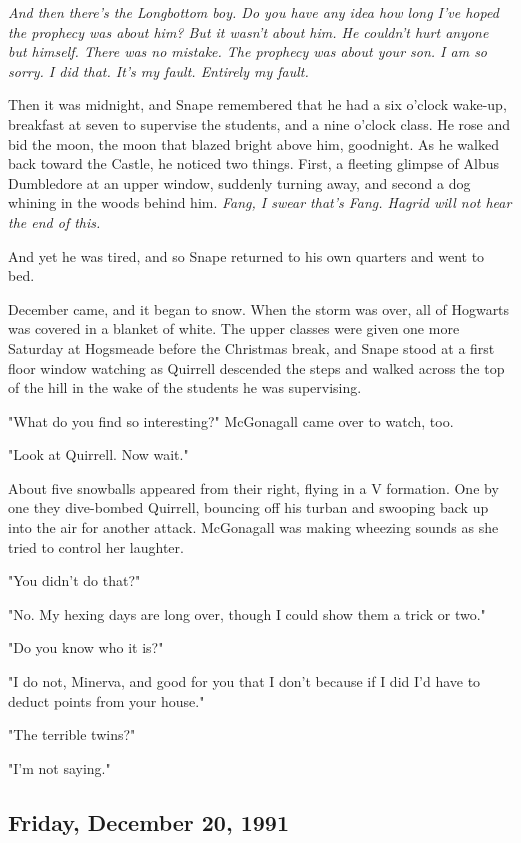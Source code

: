 \documentclass[a4paper,11pt]{article}
\begin{document}
\emph{And then there's the Longbottom boy. Do you have any idea how long I've hoped the prophecy was about him? But it wasn't about him. He couldn't hurt anyone but himself. There was no mistake. The prophecy was about your son. I am so sorry. I did that. It's my fault. Entirely my fault.}

Then it was midnight, and Snape remembered that he had a six o'clock wake-up, breakfast at seven to supervise the students, and a nine o'clock class. He rose and bid the moon, the moon that blazed bright above him, goodnight. As he walked back toward the Castle, he noticed two things. First, a fleeting glimpse of Albus Dumbledore at an upper window, suddenly turning away, and second a dog whining in the woods behind him. \emph{Fang, I swear that's Fang. Hagrid will not hear the end of this.}

And yet he was tired, and so Snape returned to his own quarters and went to bed.

December came, and it began to snow. When the storm was over, all of Hogwarts was covered in a blanket of white. The upper classes were given one more Saturday at Hogsmeade before the Christmas break, and Snape stood at a first floor window watching as Quirrell descended the steps and walked across the top of the hill in the wake of the students he was supervising.

"What do you find so interesting?" McGonagall came over to watch, too.

"Look at Quirrell. Now wait."

About five snowballs appeared from their right, flying in a V formation. One by one they dive-bombed Quirrell, bouncing off his turban and swooping back up into the air for another attack. McGonagall was making wheezing sounds as she tried to control her laughter.

"You didn't do that?"

"No. My hexing days are long over, though I could show them a trick or two."

"Do you know who it is?"

"I do not, Minerva, and good for you that I don't because if I did I'd have to deduct points from your house."

"The terrible twins?"

"I'm not saying."

\subsection{Friday, December 20, 1991}
\end{document}
